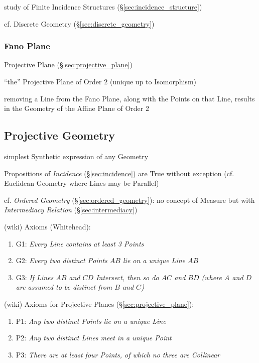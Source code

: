 study of Finite Incidence Structures (\S\ref{sec:incidence_structure})

cf. Discrete Geometry (\S\ref{sec:discrete_geometry})



\subsubsection{Fano Plane}\label{sec:fano_plane}

Projective Plane (\S\ref{sec:projective_plane})

``the'' Projective Plane of Order $2$ (unique up to Isomorphism)

removing a Line from the Fano Plane, along with the Points on that Line, results
in the Geometry of the Affine Plane of Order 2



\subsection{Projective Geometry}\label{sec:projective_geometry}

simplest Synthetic expression of any Geometry

Propositions of \emph{Incidence} (\S\ref{sec:incidence}) are True without
exception (cf. Euclidean Geometry where Lines may be Parallel)

\fist cf. \emph{Ordered Geometry} (\S\ref{sec:ordered_geometry}): no concept of
Measure but with \emph{Intermediacy Relation} (\S\ref{sec:intermediacy})

(wiki) Axioms (Whitehead):
\begin{enumerate}
  \item G1: \emph{Every Line contains at least 3 Points}
  \item G2: \emph{Every two distinct Points $AB$ lie on a unique Line $AB$}
  \item G3: \emph{If Lines $AB$ and $CD$ Intersect, then so do $AC$ and $BD$
    (where $A$ and $D$ are assumed to be distinct from $B$ and $C$)}
\end{enumerate}

(wiki) Axioms for Projective Planes (\S\ref{sec:projective_plane}):
\begin{enumerate}
  \item P1: \emph{Any two distinct Points lie on a unique Line}
  \item P2: \emph{Any two distinct Lines meet in a unique Point}
  \item P3: \emph{There are at least four Points, of which no three are
    Collinear}
\end{enumerate}

